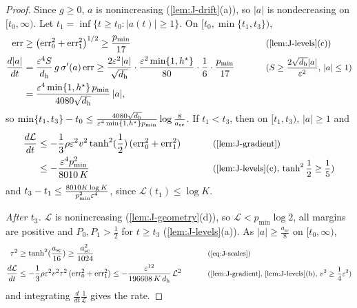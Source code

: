 \begin{proof}
Since $g\ge0$, $a$ is nonincreasing (\cref{lem:J-drift}(a)), so $|a|$ is nondecreasing on $[t_0,\infty)$. Let $t_1=\inf\{t\ge t_0:|a(t)|\ge1\}$. On
$[t_0,\min\{t_1,t_3\})$,
\begin{alignat*}{2}
 \mathrm{err}&\ge\bigl(\mathrm{err}_0^2+\mathrm{err}_1^2\bigr)^{1/2}\ge\frac{p_{\min}}{17} &\qquad& \why{\cref{lem:J-levels}(c)}\\
 \frac{d|a|}{dt}&=\frac{\initscale^4S}{d_{\mathrm h}}\,g\,\sigma'(a)\,\mathrm{err}\ge\frac{2\initscale^2|a|}{\sqrt{d_{\mathrm h}}}\cdot\frac{\initscale^2\min\{1,h^\star\}}{80}\cdot\frac{1}{6}\cdot\frac{p_{\min}}{17} && \why{$S\ge\frac{2\sqrt{d_{\mathrm h}}|a|}{\initscale^2}$, $|a|\le1$}\\
 &=\frac{\initscale^4\min\{1,h^\star\}\,p_{\min}}{4080\sqrt{d_{\mathrm h}}}\,|a|,
\end{alignat*}
so $\min\{t_1,t_3\}-t_0\le\frac{4080\sqrt{d_{\mathrm h}}}{\varepsilon^4\min\{1,h^\star\}p_{\min}}\log\frac{8}{a_{\mathrm{sc}}}$. If $t_1<t_3$, then on $[t_1,t_3)$, $|a|\ge1$ and
\begin{alignat*}{2}
 \ddt{\mathcal L}&\le-\tfrac{1}{3}\rho\initscale^2v^2\tanh^2(\tfrac{1}{2})\,(\mathrm{err}_0^2+\mathrm{err}_1^2) &\qquad& \why{\cref{lem:J-gradient}}\\
 &\le-\frac{\initscale^4p_{\min}^2}{8010\,K} && \why{\cref{lem:J-levels}(c), $\tanh^2\tfrac{1}{2}\ge\tfrac{1}{5}$}
\end{alignat*}
and $t_3-t_1\le\frac{8010K\log K}{p_{\min}^2\varepsilon^4}$, since $\mathcal L(t_1)\le\log K$.

\emph{After $t_3$.} $\mathcal L$ is nonincreasing (\cref{lem:J-geometry}(d)), so $\mathcal L<p_{\min}\log2$, all margins are positive and $P_0,P_1>\frac{1}{2}$
for $t\ge t_3$ (\cref{lem:J-levels}(a)). As $|a|\ge\frac{a_{\mathrm{sc}}}{8}$ on $[t_0,\infty)$,
\begin{alignat*}{2}
 \tau^2&\ge\tanh^2(\tfrac{a_{\mathrm{sc}}}{16})\ge\frac{a_{\mathrm{sc}}^2}{1024} &\qquad& \why{\cref{eq:J-scales}}\\
 \ddt{\mathcal L}&\le-\tfrac{1}{3}\rho\initscale^2v^2\tau^2\,(\mathrm{err}_0^2+\mathrm{err}_1^2)\le-\frac{\initscale^{12}}{196608\,K\,d_{\mathrm h}}\,\mathcal L^2 && \why{\cref{lem:J-gradient}, \cref{lem:J-levels}(b), $v^2\ge\tfrac{1}{4}\initscale^2$}
\end{alignat*}
and integrating $\frac{d}{dt}\frac{1}{\mathcal L}$ gives the rate.
\end{proof}

